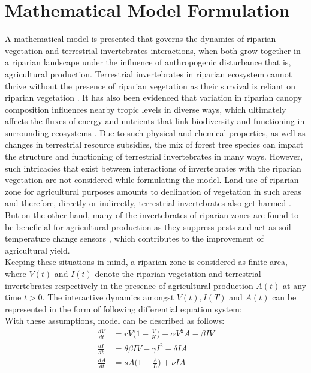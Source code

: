 \documentclass[12pt,a4wide]{report}
\numberwithin{equation}{chapter}
\numberwithin{theorem}{chapter}
\begin{document}
\section{Mathematical Model Formulation}
A mathematical model is presented that governs the dynamics of riparian vegetation and terrestrial invertebrates interactions, when both grow together in a riparian landscape under the influence of anthropogenic disturbance that is, agricultural production. Terrestrial invertebrates in riparian ecosystem cannot thrive without the presence of riparian vegetation as their survival is reliant on riparian vegetation \citep{popescu2021riparian, forio2020small, edwards1996effect, ramey2017terrestrial}.  It has also been evidenced that variation in riparian canopy composition influences nearby tropic levels in diverse ways, which ultimately affects the fluxes of energy and nutrients that link biodiversity and functioning in surrounding ecosystems \cite{kominoski2011}. Due to such physical and chemical properties, as well as changes in terrestrial resource subsidies, the mix of forest tree species can impact the structure and functioning of terrestrial invertebrates in many ways. However, such intricacies that exist between interactions of invertebrates with the riparian vegetation are not considered while formulating  the model. Land use of riparian zone for agricultural purposes amounts to declination of vegetation in such areas and therefore, directly or indirectly,  terrestrial invertebrates also get harmed \cite{popescu2021riparian}. But on the other hand, many of the invertebrates of riparian zones are found to be beneficial for agricultural production as they suppress pests \citep{krell2015aquatic, riis2020global, stockan2014effects, cole2012riparian} and act as soil temperature change sensors \cite{greenwood1995patial}, which contributes to the improvement of agricultural yield.\\
Keeping these situations in mind, a riparian zone is considered as finite area, where $V(t)$ and $I(t)$ denote the riparian vegetation and terrestrial invertebrates respectively in the presence of agricultural production $A(t)$ at any time $t>0$. The interactive dynamics amongst $V(t), I(T)$ and $A(t)$ can be represented in the form of following differential equation system:\\
With these assumptions, model can be described as follows:
\begin{subequations}\label{sec2:e1}
	\begin{align}
	\label{sec2:e1a} \frac{dV}{dt}&=rV\bigg(1-\frac{V}{K}\bigg)-\alpha V^2A -\beta IV\\
	\label{sec2:e1b} \frac{dI}{dt}&=\theta \beta IV -\gamma I^2 - \delta IA\\
	\label{sec2:e1c} \frac{dA}{dt}&= sA\bigg(1-\frac{A}{L}\bigg)+\nu IA
	\end{align}
\end{subequations}
\end{document}
